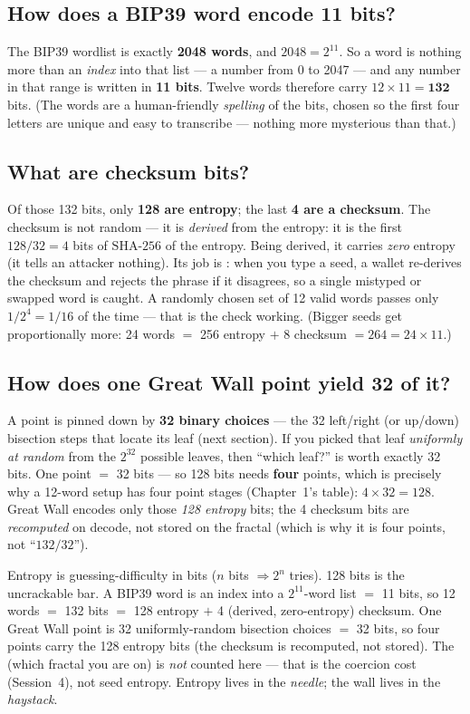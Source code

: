 \documentclass[a4paper,11pt]{report}
\begin{document}
\subsection{How does a BIP39 word encode 11 bits?}
The BIP39 wordlist is exactly \textbf{2048 words}, and $2048 = 2^{11}$. So a word
is nothing more than an \emph{index} into that list — a number from 0 to 2047 —
and any number in that range is written in \textbf{11 bits}. Twelve words
therefore carry $12\times 11 = \textbf{132}$ bits. (The words are a
human-friendly \emph{spelling} of the bits, chosen so the first four letters are
unique and easy to transcribe — nothing more mysterious than that.)

\subsection{What are checksum bits?}
Of those 132 bits, only \textbf{128 are entropy}; the last \textbf{4 are a
checksum}. The checksum is not random — it is \emph{derived} from the entropy: it
is the first $128/32 = 4$ bits of $\mathrm{SHA\text{-}256}$ of the entropy. Being
derived, it carries \emph{zero} entropy (it tells an attacker nothing). Its job is
: when you type a seed, a wallet re-derives the checksum and
rejects the phrase if it disagrees, so a single mistyped or swapped word is
caught. A randomly chosen set of 12 valid words passes only $1/2^{4} = 1/16$ of
the time — that is the check working. (Bigger seeds get proportionally more:
24 words $=$ 256 entropy $+$ 8 checksum $= 264 = 24\times 11$.)

\subsection{How does one Great Wall point yield 32 of it?}
A point is pinned down by \textbf{32 binary choices} — the 32 left/right (or
up/down) bisection steps that locate its leaf (next section). If you picked that
leaf \emph{uniformly at random} from the $2^{32}$ possible leaves, then ``which
leaf?'' is worth exactly 32 bits. One point $=$ 32 bits — so 128 bits needs
\textbf{four} points, which is precisely why a 12-word setup has four point stages
(Chapter~1's table): $4\times32 = 128$. Great Wall encodes only those \emph{128
entropy} bits; the 4 checksum bits are \emph{recomputed} on decode, not stored on
the fractal (which is why it is four points, not ``$132/32$'').

\begin{keyidea}
Entropy is guessing-difficulty in bits ($n$ bits $\Rightarrow 2^n$ tries). 128
bits is the uncrackable bar. A BIP39 word is an index into a $2^{11}$-word list
$=$ 11 bits, so 12 words $=$ 132 bits $=$ 128 entropy $+$ 4 (derived, zero-entropy)
checksum. One Great Wall point is 32 uniformly-random bisection choices $=$ 32
bits, so four points carry the 128 entropy bits (the checksum is recomputed, not
stored). The  (which fractal you are on) is \emph{not} counted
here — that is the coercion cost (Session~4), not seed entropy. Entropy lives in
the \emph{needle}; the wall lives in the \emph{haystack}.
\end{keyidea}
\end{document}
